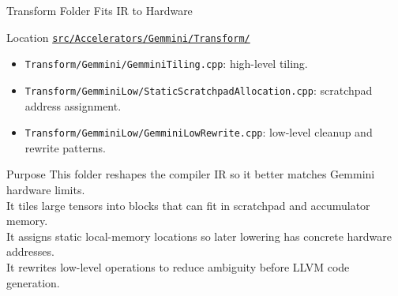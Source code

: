 \documentclass[aspectratio=169,10pt]{beamer}
\newcommand{\code}[1]{\texttt{\footnotesize #1}}
\newcommand{\repoRoot}{/home/lahcen/toolchains/onnx-mlir-xcompile/onnx-mlir}
\newcommand{\pathcode}[1]{\href{run:\repoRoot/#1}{\texttt{\scriptsize #1}}}
\begin{document}
\begin{frame}{Transform Folder Fits IR to Hardware}
  \begin{block}{Location}
    \pathcode{src/Accelerators/Gemmini/Transform/}
  \end{block}
  \begin{itemize}
    \item \code{Transform/Gemmini/GemminiTiling.cpp}: high-level tiling.
    \item \code{Transform/GemminiLow/StaticScratchpadAllocation.cpp}: scratchpad address assignment.
    \item \code{Transform/GemminiLow/GemminiLowRewrite.cpp}: low-level cleanup and rewrite patterns.
  \end{itemize}
  \begin{block}{Purpose}
    This folder reshapes the compiler IR so it better matches Gemmini hardware limits.\\
    It tiles large tensors into blocks that can fit in scratchpad and accumulator memory.\\
    It assigns static local-memory locations so later lowering has concrete hardware addresses.\\
    It rewrites low-level operations to reduce ambiguity before LLVM code generation.
  \end{block}
\end{frame}
\end{document}
